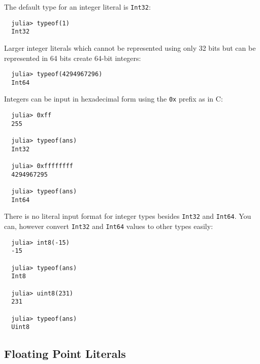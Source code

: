 \documentclass{article}
\renewcommand{\sec}[1]{\label{sec:#1}}
\begin{document}
The default type for an integer literal is \verb|Int32|:
\begin{verbatim}
  julia> typeof(1)
  Int32
\end{verbatim}
Larger integer literals which cannot be represented using only 32 bits but can be represented in 64 bits create 64-bit integers:
\begin{verbatim}
  julia> typeof(4294967296)
  Int64
\end{verbatim}
Integers can be input in hexadecimal form using the \verb|0x| prefix as in C:
\begin{verbatim}
  julia> 0xff
  255

  julia> typeof(ans)
  Int32

  julia> 0xffffffff
  4294967295

  julia> typeof(ans)
  Int64
\end{verbatim}
There is no literal input format for integer types besides \verb|Int32| and \verb|Int64|. You can, however convert \verb|Int32| and \verb|Int64| values to other types easily:
\begin{verbatim}
  julia> int8(-15)
  -15

  julia> typeof(ans)
  Int8

  julia> uint8(231)
  231

  julia> typeof(ans)
  Uint8
\end{verbatim}

\subsection{Floating Point Literals}\sec{floating-point-literals}
\end{document}
